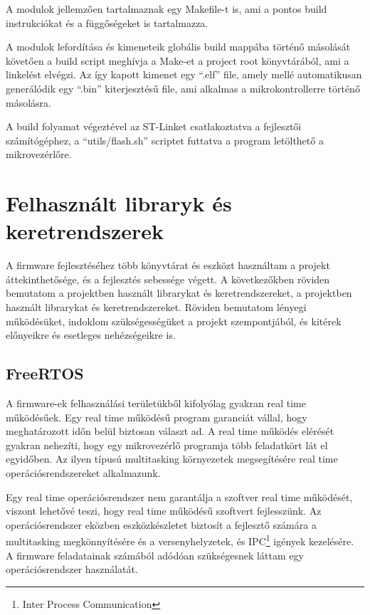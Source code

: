 A modulok jellemzően tartalmaznak egy Makefile-t is, ami a pontos build
instrukciókat és a függőségeket is tartalmazza.

A modulok lefordítása és kimeneteik globális build mappába történő másolását
követően a build script meghívja a Make-et a project root könyvtárából, ami a
linkelést elvégzi. Az így kapott kimenet egy ``.elf'' file, amely mellé
automatikusan generálódik egy ``.bin'' kiterjesztésű file, ami alkalmas a
mikrokontrollerre történő másolásra.

\medskip

A build folyamat végeztével az ST-Linket csatlakoztatva a fejlesztői
számítógéphez, a ``utils/flash.sh'' scriptet futtatva a program letölthető a
mikrovezérlőre. 

\section{Felhasznált libraryk és keretrendszerek}

A firmware fejlesztéséhez több könyvtárat és eszközt használtam a projekt
áttekinthetősége, és a fejlesztés sebessége végett. A következőkben röviden
bemutatom a projektben használt librarykat és keretrendszereket, a projektben
használt librarykat és keretrendszereket. Röviden bemutatom lényegi működésüket,
indoklom szükségességüket a projekt szempontjából, és kitérek előnyeikre és
esetleges nehézségeikre is.

\subsection{FreeRTOS}

A firmware-ek felhasználási területükből kifolyólag gyakran real time
működésűek. Egy real time működésű program garanciát vállal, hogy meghatározott
időn belül biztosan választ ad. A real time működés elérését gyakran
nehezíti, hogy egy mikrovezérlő programja több feladatkört lát el egyidőben. Az
ilyen típusú multitasking környezetek megsegítésére real time
operációsrendszereket alkalmazunk.

Egy real time operációsrendszer nem garantálja a szoftver real time működését,
viszont lehetővé teszi, hogy real time működésű szoftvert fejlesszünk. Az
operációsrendszer eközben eszközkészletet biztosít a fejlesztő számára
a multitasking megkönnyítésére és a versenyhelyzetek, és IPC\footnote{Inter
Process Communication} igények kezelésére. A firmware feladatainak
számából adódóan szükségesnek láttam egy operációsrendszer használatát.

